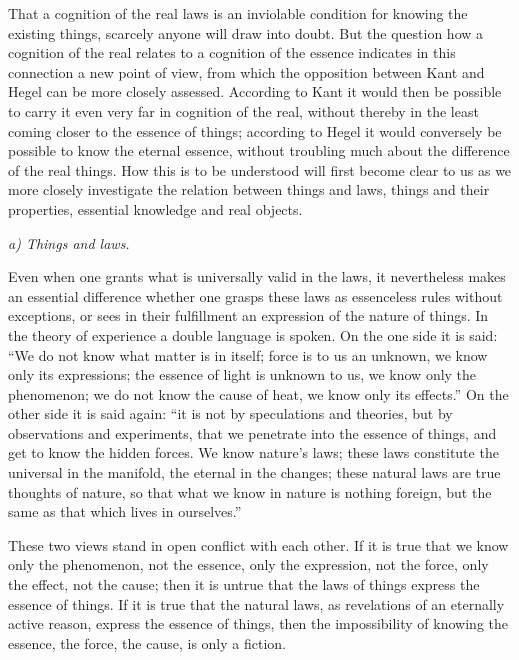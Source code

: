 \documentclass[12pt]{book}
\begin{document}
That a cognition of the real laws is an inviolable condition for knowing the
existing things, scarcely anyone will draw into doubt. But the question how a
cognition of the real relates to a cognition of the essence indicates in this
connection a new point of view, from which the opposition between Kant and Hegel
can be more closely assessed. According to Kant it would then be possible to carry
it even very far in cognition of the real, without thereby in the least coming
closer to the essence of things; according to Hegel it would conversely be possible
to know the eternal essence, without troubling much about the difference of the real
things. How this is to be understood will first become clear to us as we more
closely investigate the relation between things and laws, things and their
properties, essential knowledge and real objects.

\emph{a) Things and laws.}

Even when one grants what is universally valid in the laws, it nevertheless makes an
essential difference whether one grasps these laws as essenceless rules without
exceptions, or sees in their fulfillment an expression of the nature of things.
In the theory of experience a double language is spoken. On the one side it is
said: ``We do not know what matter is in itself; force is to us an unknown, we know
only its expressions; the essence of light is unknown to us, we know only the
phenomenon; we do not know the cause of heat, we know only its effects.'' On the
other side it is said again: ``it is not by speculations and theories, but by
observations and experiments, that we penetrate into the essence of things, and get
to know the hidden forces. We know nature's laws; these laws constitute the
universal in the manifold, the eternal in the changes; these natural laws are true
thoughts of nature, so that what we know in nature is nothing foreign, but the same
as that which lives in ourselves.''

These two views stand in open conflict with each other. If it is true that we know
only the phenomenon, not the essence, only the expression, not the force, only the
effect, not the cause; then it is untrue that the laws of things express the essence
of things. If it is true that the natural laws, as revelations of an eternally
active reason, express the essence of things, then the impossibility of knowing the
essence, the force, the cause, is only a fiction.
\end{document}
